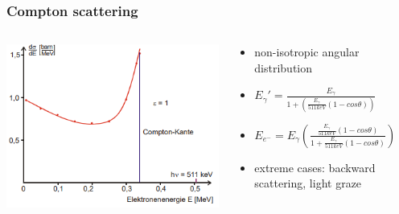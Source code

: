 \documentclass[aspectratio=1610, 9pt]{beamer}
\begin{document}
\begin{frame}\frametitle{Compton scattering}
  \begin{columns}
    \begin{column}[c]{0.48\textwidth}
      \includegraphics[width=\textwidth]{plots/compton_kante.png}
    \end{column}
    \begin{column}[c]{0.48\textwidth}
      \begin{itemize}
        \item non-isotropic angular distribution
        \item $E_\gamma\prime = \frac{E_\gamma}{1 + \left( \frac{E_\gamma}{511 keV} (1 - cos\theta)\right)}$
        \item $E_{e^-} = E_\gamma \left( \frac{\frac{E_\gamma}{511 keV}(1 - cos\theta)}{1 + \frac{E_\gamma}{511 keV}(1 - cos\theta)} \right)$
        \item extreme cases: backward scattering, light graze
      \end{itemize}
    \end{column}
  \end{columns}
\end{frame}
\end{document}
